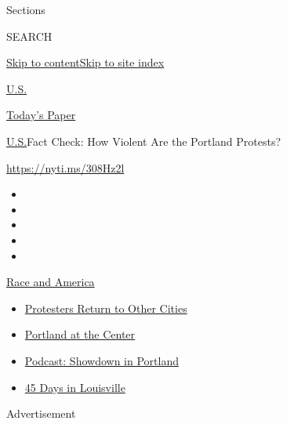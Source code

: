 Sections

SEARCH

\protect\hyperlink{site-content}{Skip to
content}\protect\hyperlink{site-index}{Skip to site index}

\href{https://www.nytimes.com/section/us}{U.S.}

\href{https://myaccount.nytimes.com/auth/login?response_type=cookie\&client_id=vi}{}

\href{https://www.nytimes.com/section/todayspaper}{Today's Paper}

\href{/section/us}{U.S.}\textbar{}Fact Check: How Violent Are the
Portland Protests?

\url{https://nyti.ms/308Hz2l}

\begin{itemize}
\item
\item
\item
\item
\item
\end{itemize}

\href{https://www.nytimes.com/news-event/george-floyd-protests-minneapolis-new-york-los-angeles?action=click\&pgtype=Article\&state=default\&region=TOP_BANNER\&context=storylines_menu}{Race
and America}

\begin{itemize}
\tightlist
\item
  \href{https://www.nytimes.com/2020/07/26/us/protests-portland-seattle-trump.html?action=click\&pgtype=Article\&state=default\&region=TOP_BANNER\&context=storylines_menu}{Protesters
  Return to Other Cities}
\item
  \href{https://www.nytimes.com/2020/07/24/us/portland-oregon-protests-white-race.html?action=click\&pgtype=Article\&state=default\&region=TOP_BANNER\&context=storylines_menu}{Portland
  at the Center}
\item
  \href{https://www.nytimes.com/2020/07/23/podcasts/the-daily/portland-protests.html?action=click\&pgtype=Article\&state=default\&region=TOP_BANNER\&context=storylines_menu}{Podcast:
  Showdown in Portland}
\item
  \href{https://www.nytimes.com/interactive/2020/07/16/us/black-lives-matter-protests-louisville-breonna-taylor.html?action=click\&pgtype=Article\&state=default\&region=TOP_BANNER\&context=storylines_menu}{45
  Days in Louisville}
\end{itemize}

Advertisement

